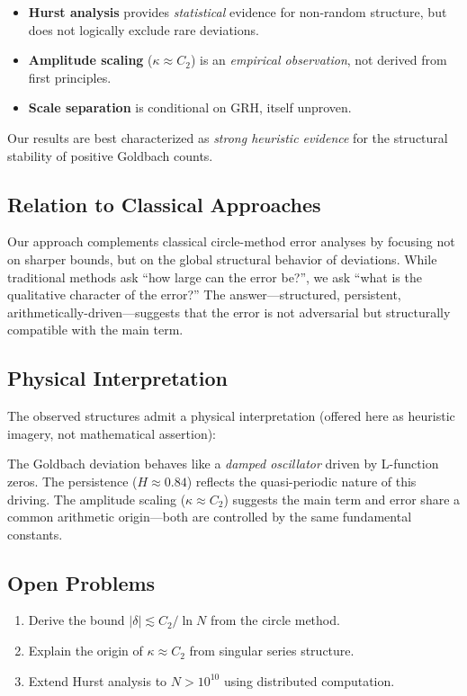 \documentclass[10pt,twocolumn]{article}
\begin{document}
\begin{itemize}[nosep]
\item \textbf{Hurst analysis} provides \emph{statistical} evidence for non-random structure, but does not logically exclude rare deviations.
\item \textbf{Amplitude scaling} ($\kappa\approx C_2$) is an \emph{empirical observation}, not derived from first principles.
\item \textbf{Scale separation} is conditional on GRH, itself unproven.
\end{itemize}

Our results are best characterized as \emph{strong heuristic evidence} for the structural stability of positive Goldbach counts.

\subsection{Relation to Classical Approaches}

Our approach complements classical circle-method error analyses by focusing not on sharper bounds, but on the global structural behavior of deviations. While traditional methods ask ``how large can the error be?'', we ask ``what is the qualitative character of the error?'' The answer---structured, persistent, arithmetically-driven---suggests that the error is not adversarial but structurally compatible with the main term.

\subsection{Physical Interpretation}

The observed structures admit a physical interpretation (offered here as heuristic imagery, not mathematical assertion):

The Goldbach deviation behaves like a \emph{damped oscillator} driven by L-function zeros. The persistence ($H\approx0.84$) reflects the quasi-periodic nature of this driving. The amplitude scaling ($\kappa\approx C_2$) suggests the main term and error share a common arithmetic origin---both are controlled by the same fundamental constants.


\subsection{Open Problems}

\begin{enumerate}[nosep]
\item Derive the bound $|\delta|\lesssim C_2/\ln N$ from the circle method.
\item Explain the origin of $\kappa\approx C_2$ from singular series structure.
\item Extend Hurst analysis to $N>10^{10}$ using distributed computation.
\end{enumerate}
\end{document}
